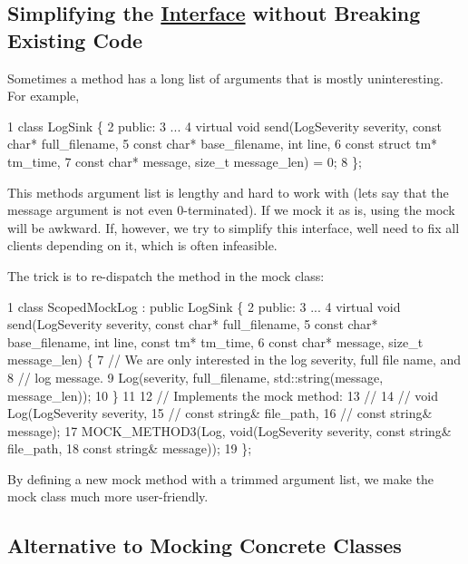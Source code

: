 \subsection*{Simplifying the \hyperlink{class_interface}{Interface} without Breaking Existing Code}

Sometimes a method has a long list of arguments that is mostly uninteresting. For example,


\begin{DoxyCode}
1 class LogSink \{
2  public:
3   ...
4   virtual void send(LogSeverity severity, const char* full\_filename,
5                     const char* base\_filename, int line,
6                     const struct tm* tm\_time,
7                     const char* message, size\_t message\_len) = 0;
8 \};
\end{DoxyCode}


This method\textquotesingle{}s argument list is lengthy and hard to work with (let\textquotesingle{}s say that the {\ttfamily message} argument is not even 0-\/terminated). If we mock it as is, using the mock will be awkward. If, however, we try to simplify this interface, we\textquotesingle{}ll need to fix all clients depending on it, which is often infeasible.

The trick is to re-\/dispatch the method in the mock class\+:


\begin{DoxyCode}
1 class ScopedMockLog : public LogSink \{
2  public:
3   ...
4   virtual void send(LogSeverity severity, const char* full\_filename,
5                     const char* base\_filename, int line, const tm* tm\_time,
6                     const char* message, size\_t message\_len) \{
7     // We are only interested in the log severity, full file name, and
8     // log message.
9     Log(severity, full\_filename, std::string(message, message\_len));
10   \}
11 
12   // Implements the mock method:
13   //
14   //   void Log(LogSeverity severity,
15   //            const string& file\_path,
16   //            const string& message);
17   MOCK\_METHOD3(Log, void(LogSeverity severity, const string& file\_path,
18                          const string& message));
19 \};
\end{DoxyCode}


By defining a new mock method with a trimmed argument list, we make the mock class much more user-\/friendly.

\subsection*{Alternative to Mocking Concrete Classes}

